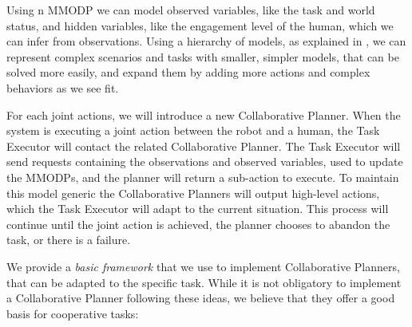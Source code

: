 Using n MMODP we can model observed variables, like the task and world status, and hidden variables, like the engagement level of the human, which we can infer from observations. Using a hierarchy of models, as explained in \cite{pineau2001hierarchical}, we can represent complex scenarios and tasks with smaller, simpler models, that can be solved more easily, and expand them by adding more actions and complex behaviors as we see fit.

For each joint actions, we will introduce a new Collaborative Planner. When the system is executing a joint action between the robot and a human, the Task Executor will contact the related Collaborative Planner.  The Task Executor will send requests containing the observations and observed variables, used to update the MMODPs, and the planner will return a sub-action to execute. To maintain this model generic the Collaborative Planners will output high-level actions, which the Task Executor will adapt to the current situation. This process will continue until the joint action is achieved, the planner chooses to abandon the task, or there is a failure.

We provide a \textit{basic framework} that we use to implement Collaborative Planners, that can be adapted to the specific task. While it is not obligatory to implement a Collaborative Planner following these ideas, we believe that they offer a good basis for cooperative tasks:

